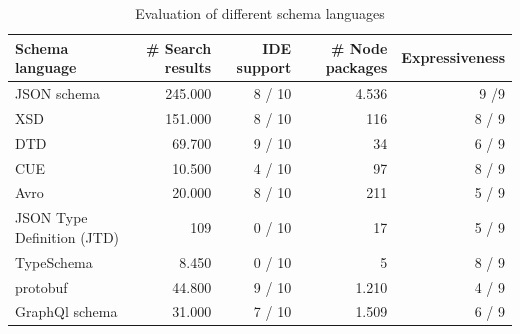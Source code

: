     \begin{table}[]
    \centering
    \caption{Evaluation of different schema languages\label{tab:all}}
        \begin{tabular}{@{}lrrrr@{}}
        \toprule
        \textbf{Schema language} &
          \textbf{\# Search results } &
          \textbf{IDE support} &
          \textbf{\# Node packages} &
          \textbf{Expressiveness} \\ \midrule
        JSON schema &
          245.000 &
          8 / 10 &
          4.536 & 9 /9 \\
        XSD & 151.000 & 8 / 10 & 116 & 8 / 9 \\
        DTD & 69.700 & 9 / 10 & 34 & 6 / 9 \\
        CUE & 10.500 & 4 / 10 & 97 &   8 / 9 \\
        Avro & 20.000 & 8 / 10 & 211 &  5 / 9 \\
        JSON Type Definition (JTD) &  109 & 0 / 10 &  17 & 5 / 9 \\
        TypeSchema &  8.450 & 0 / 10 & 5 & 8 / 9 \\
        protobuf &  44.800 & 9 / 10 & 1.210 & 4 / 9 \\
        GraphQl schema & 31.000 & 7 / 10 & 1.509 & 6 / 9\\ \bottomrule
        \end{tabular}
    \end{table}


